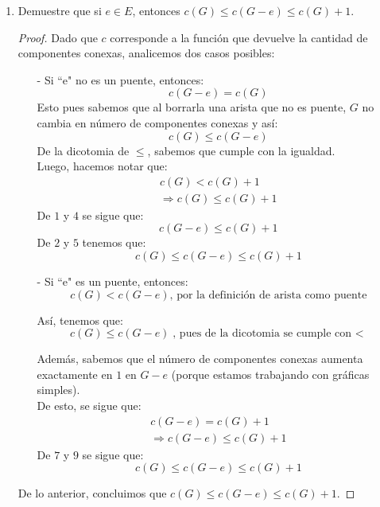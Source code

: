 \documentclass{article}
\begin{document}
  \begin{enumerate}
    \item Demuestre que si $e \in E$, entonces $c(G) \le c(G-e) \le c(G) + 1$.

      \renewcommand\qedsymbol{QED}
      \begin{proof}
        Dado que $c$ corresponde a la función que devuelve la cantidad de componentes
        conexas, analicemos dos casos posibles:

        \begin{itemize}
        \item[-] Si ``e" no es un puente, entonces:
          \begin{equation}
            c(G -e) = c(G)
          \end{equation}
          Esto pues sabemos que al borrarla una arista  que no es puente, $G$ no cambia en
          número de componentes conexas y así:
          \begin{equation}
            c(G) \leq c(G -e)
          \end{equation}
          De la dicotomia de $\leq$, sabemos que cumple con la igualdad. \\
          Luego, hacemos notar que:
          \begin{eqnarray}
            c(G) < c(G) +1\\
            \Rightarrow c(G) \leq c(G) +1
          \end{eqnarray}
          De $1$ y $4$ se sigue que:
          \begin{equation}
            c(G -e) \leq c(G) +1
          \end{equation}
          De $2$ y $5$ tenemos que:
          \[
          c(G) \le c(G-e) \le c(G) + 1
          \]

        \item[-] Si ``e" es un puente, entonces:
          \begin{equation}
            c(G) < c(G -e) \text{, por la definición de arista como puente}
          \end{equation}

          Así, tenemos que:
          \begin{equation}
            c(G) \leq c(G -e) \text{, pues de la dicotomia se cumple con $<$}
          \end{equation}

          Además, sabemos que el número de componentes conexas aumenta exactamente en
          $1$ en $G -e$ (porque estamos trabajando con gráficas simples). \\
          De esto, se sigue que:
          \begin{eqnarray}
            c(G -e) = c(G) +1\\
            \Rightarrow c(G -e) \leq c(G) +1
          \end{eqnarray}
          De $7$ y $9$ se sigue que:
          \[
          c(G) \le c(G-e) \le c(G) + 1
          \]
        \end{itemize}
        De lo anterior, concluimos que $c(G) \le c(G-e) \le c(G) + 1$.
      \end{proof}


\end{enumerate}
\end{document}
